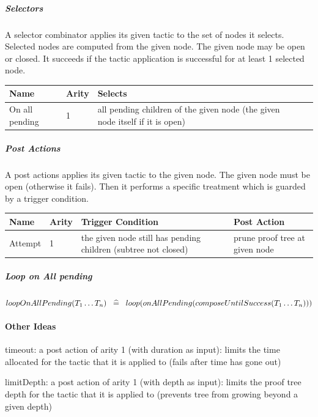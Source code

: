 \subparagraph{Selectors}

A selector combinator applies its given tactic to the set of nodes it selects. Selected nodes are computed from the given node. The given node may be open or closed. It succeeds if the tactic application is successful for at least 1 selected node. 

\begin{center}
    \begin{tabular}{ | l | l | l | p{5cm} |}
    \hline
	Name & Arity & Selects \\ \hline
	On all pending  & 1 & all pending children of the given node (the given node itself if it is open) \\ \hline
    \end{tabular}
\end{center}

\subparagraph{Post Actions}

A post actions applies its given tactic to the given node. The given node must be open (otherwise it fails). Then it performs a specific treatment which is guarded by a trigger condition. 

\begin{center}
    \begin{tabular}{ | p{} | p{1cm} | p{6cm} | p{5cm} |}
    \hline
	Name & Arity & Trigger Condition & Post Action \\ \hline
	Attempt & 1 & the given node still has pending children (subtree not closed) & prune proof tree at given node  \\ \hline
    \end{tabular}
\end{center}

\subparagraph{Loop on All pending}

$loopOnAllPending(T_1 \ldots T_n) \;\;\mathrel{\widehat=}\;\; loop(onAllPending(composeUntilSuccess(T_1 \ldots T_n)))$

\paragraph{Other Ideas}

    timeout: a post action of arity 1 (with duration as input): limits the time allocated for the tactic that it is applied to (fails after time has gone out)

    limitDepth: a post action of arity 1 (with depth as input): limits the proof tree depth for the tactic that it is applied to (prevents tree from growing beyond a given depth)

